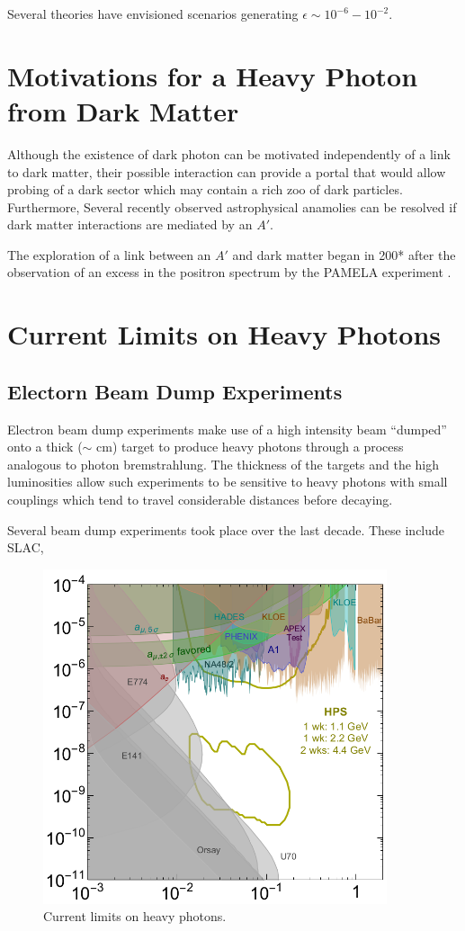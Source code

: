 Several theories have envisioned scenarios generating 
$\epsilon \sim 10^{-6} - 10^{-2}$.

\section{Motivations for a Heavy Photon from Dark Matter}

Although the existence of dark photon can be motivated independently of a link
to dark matter, their possible interaction can provide a portal that would allow
probing of a dark sector which may contain a rich zoo of dark particles.  
Furthermore, Several recently observed astrophysical anamolies can be 
resolved if dark matter interactions are mediated by an $A'$.

The exploration of a link between an $A'$ and dark matter began in 200* after
the observation of an excess in the positron spectrum by the PAMELA experiment
\cite{}.

\section{Current Limits on Heavy Photons}

\subsection{Electorn Beam Dump Experiments}

Electron beam dump experiments make use of a high intensity beam ``dumped'' onto
a thick ($\sim$ cm) target to produce heavy photons through a process analogous
to photon bremstrahlung.  The thickness of the targets and the high luminosities
allow such experiments to be sensitive to heavy photons with small couplings 
which tend to travel considerable distances before decaying.  

Several beam dump experiments took place over the last decade. These include 
SLAC, 


\begin{figure}[t]
    \centering
    \includegraphics[width=0.9\textwidth]{images/ap_current_limits.png}
    \caption{Current limits on heavy photons.}
    \label{fig:svt_layout_render}
\end{figure}
